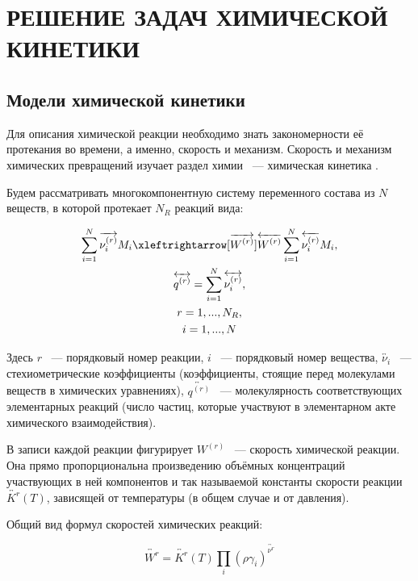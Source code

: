 \section{РЕШЕНИЕ ЗАДАЧ ХИМИЧЕСКОЙ КИНЕТИКИ}

\subsection{Модели химической кинетики}

Для описания химической реакции необходимо знать закономерности её протекания во времени, а именно, скорость и механизм. Скорость и
механизм химических превращений изучает раздел химии ~--- химическая кинетика \cite{Article5, book7, book8}.

Будем рассматривать многокомпонентную систему переменного состава из $N$ веществ, в которой протекает $N_R$ реакций вида:

\begin{equation}
    \begin{gathered}
    \sum\limits_{i = 1}^{N}\overrightarrow{\nu_i^{(r)}}M_i \xleftrightarrow[\overrightarrow{W^{(r)}}]{\overleftarrow{W^{(r)}}} \sum\limits_{i = 1}^{N}\overleftarrow{\nu_i^{(r)}}M_i,\\
    \overleftrightarrow{q^{(r)}} = \sum\limits_{i = 1}^{N}\overleftrightarrow{\nu_i^{(r)}},\\
    r = 1, ..., N_R,\\
    i = 1, ..., N
    \end{gathered}
    \label{eq:ChemCommon}
\end{equation}

Здесь $r$ ~--- порядковый номер реакции, $i$ ~--- порядковый номер вещества, $\overleftrightarrow{\nu_i}$ ~--- стехиометрические
коэффициенты
(коэффициенты, стоящие перед молекулами веществ в химических уравнениях), $\overleftrightarrow{q^{(r)}}$ ~--- молекулярность
соответствующих элементарных реакций (число частиц, которые участвуют в элементарном акте химического взаимодействия).

В записи каждой реакции фигурирует $W^{(r)}$ ~--- скорость химической реакции. Она прямо пропорциональна произведению объёмных концентраций
участвующих в ней компонентов и так называемой константы скорости реакции $\overleftrightarrow{K^{r}}(T)$, зависящей от температуры
(в общем случае и от давления).

Общий вид формул скоростей химических реакций:

\begin{equation}
    \overleftrightarrow{W^{r}} = \overleftrightarrow{K^{r}}(T)\prod\limits_i(\rho\gamma_i)^{\overleftrightarrow{\nu^{r}}}
    \label{eq:Warrow}
\end{equation}

